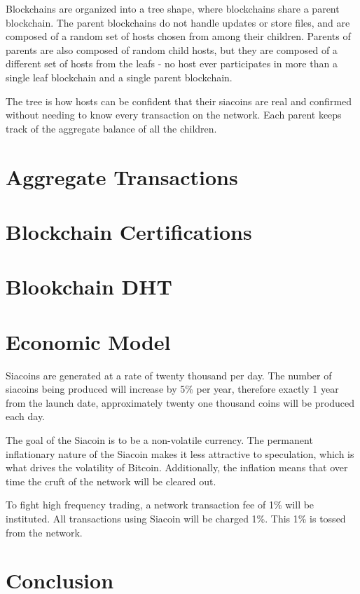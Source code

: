 \documentclass[twocolumn]{article}
\begin{document}
Blockchains are organized into a tree shape, where \childrenperparent{} blockchains share a parent blockchain.
The parent blockchains do not handle updates or store files, and are composed of a random set of hosts chosen from among their children.
Parents of parents are also composed of random child hosts, but they are composed of a different set of hosts from the leafs - no host ever participates in more than a single leaf blockchain and a single parent blockchain.

The tree is how hosts can be confident that their siacoins are real and confirmed without needing to know every transaction on the network.
Each parent keeps track of the aggregate balance of all the children.

\section{Aggregate Transactions}

\section{Blockchain Certifications}

\section{Blookchain DHT}

\section{Economic Model}

Siacoins are generated at a rate of twenty thousand per day.
The number of siacoins being produced will increase by 5\% per year, therefore exactly 1 year from the launch date, approximately twenty one thousand coins will be produced each day.

The goal of the Siacoin is to be a non-volatile currency.
The permanent inflationary nature of the Siacoin makes it less attractive to speculation, which is what drives the volatility of Bitcoin.
Additionally, the inflation means that over time the cruft of the network will be cleared out.

To fight high frequency trading, a network transaction fee of 1\% will be instituted.
All transactions using Siacoin will be charged 1\%.
This 1\% is tossed from the network.

\section{Conclusion}
\end{document}
